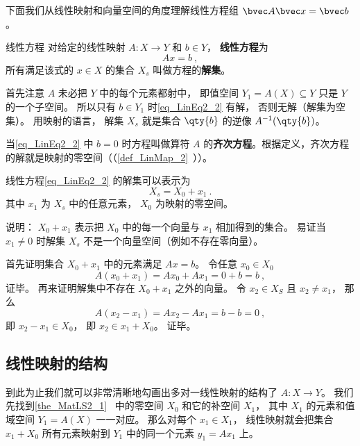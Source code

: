 
\begin{issues}
\issueDraft
\end{issues}


下面我们从线性映射和向量空间的角度理解线性方程组 $\bvec A \bvec x = \bvec b$。


\begin{definition}{线性方程}
对给定的线性映射 $A:X\to Y$ 和 $b \in Y$， \textbf{线性方程}为
\begin{equation}\label{eq_LinEq2_2}
Ax = b~,
\end{equation}
所有满足该式的 $x \in X$ 的集合 $X_s$ 叫做方程的\textbf{解集}。
\end{definition}

首先注意 $A$ 未必把 $Y$ 中的每个元素都射中， 即值空间 $Y_1 = A(X) \subseteq Y$ 只是 $Y$ 的一个子空间。 所以只有 $b \in Y_1$ 时\autoref{eq_LinEq2_2} 有解， 否则无解（解集为空集）。 用映射的语言， 解集 $X_s$ 就是集合 $\qty{b}$ 的逆像 $A^{-1}(\qty{b})$。

当\autoref{eq_LinEq2_2} 中 $b = 0$ 时方程叫做算符 $A$ 的\textbf{齐次方程}。根据定义，齐次方程的解就是映射的零空间（（\autoref{def_LinMap_2}~））。

\begin{theorem}{}\label{the_LinEq2_1}
线性方程\autoref{eq_LinEq2_2} 的解集可以表示为
\begin{equation}\label{eq_LinEq2_1}
X_s = X_0 + x_1~.
\end{equation}
其中 $x_1$ 为 $X_s$ 中的任意元素，  $X_0$ 为映射的零空间。
\end{theorem}
说明： $X_0 + x_1$ 表示把 $X_0$ 中的每一个向量与 $x_1$ 相加得到的集合。 易证当 $x_1 \ne 0$ 时解集 $X_s$ 不是一个向量空间（例如不存在零向量）。

首先证明集合 $X_0 + x_1$ 中的元素满足 $Ax = b$。 令任意 $x_0 \in X_0$
\begin{equation}
A(x_0 + x_1) = Ax_0 + Ax_1 = 0 + b = b~,
\end{equation}
证毕。 再来证明解集中不存在 $X_0 + x_1$ 之外的向量。 令 $x_2 \in X_S$ 且 $x_2 \ne x_1$， 那么
\begin{equation}
A(x_2 - x_1) = Ax_2 - Ax_1 = b - b = 0~,
\end{equation}
即 $x_2 - x_1 \in X_0$， 即 $x_2 \in x_1 + X_0$。 证毕。

\subsection{线性映射的结构}
到此为止我们就可以非常清晰地勾画出多对一线性映射的结构了 $A:X\to Y$。 我们先找到\autoref{the_MatLS2_1}~ 中的零空间 $X_0$ 和它的补空间 $X_1$， 其中 $X_1$ 的元素和值域空间 $Y_1 = A(X)$ 一一对应。 那么对每个 $x_1 \in X_1$， 线性映射就会把集合 $x_1 + X_0$ 所有元素映射到 $Y_1$ 中的同一个元素 $y_1 = Ax_1$ 上。

